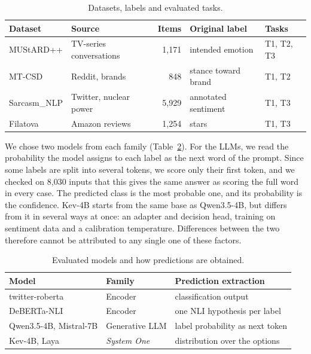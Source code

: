 \documentclass[12pt]{article}
\begin{document}
\begin{table}[!htb]
\centering
\small
\caption{Datasets, labels and evaluated tasks.}
\label{tab:bases}
\setlength{\tabcolsep}{4pt}
\begin{tabular}{llrll}
\hline
Dataset & Source & Items & Original label & Tasks \\
\hline
MUStARD++ & TV-series conversations & 1,171 & intended emotion & T1, T2, T3 \\
MT-CSD & Reddit, brands & 848 & stance toward brand & T1, T2 \\
Sarcasm\_NLP & Twitter, nuclear power & 5,929 & annotated sentiment & T1, T3 \\
Filatova & Amazon reviews & 1,254 & stars & T1, T3 \\
\hline
\end{tabular}
\end{table}

We chose two models from each family (Table~\ref{tab:modelos}). For the LLMs, we read the probability the model assigns to each label as the next word of the prompt. Since some labels are split into several tokens, we score only their first token, and we checked on 8,030 inputs that this gives the same answer as scoring the full word in every case. The predicted class is the most probable one, and its probability is the confidence. Kev-4B starts from the same base as Qwen3.5-4B, but differs from it in several ways at once: an adapter and decision head, training on sentiment data and a calibration temperature. Differences between the two therefore cannot be attributed to any single one of these factors.

\begin{table}[!htb]
\centering
\small
\caption{Evaluated models and how predictions are obtained.}
\label{tab:modelos}
\setlength{\tabcolsep}{4pt}
\begin{tabular}{lll}
\hline
Model & Family & Prediction extraction \\
\hline
twitter-roberta & Encoder & classification output \\
DeBERTa-NLI & Encoder & one NLI hypothesis per label \\
Qwen3.5-4B, Mistral-7B & Generative LLM & label probability as next token \\
Kev-4B, Laya & \emph{System One} & distribution over the options \\
\hline
\end{tabular}
\end{table}
\end{document}
